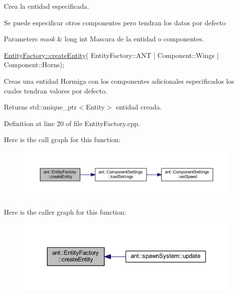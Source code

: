 Crea la entidad especificada. 

Se puede especificar otros componentes pero tendran los datos por defecto


\begin{DoxyParams}{Parameters}
{\em mask} & long int Mascara de la entidad o componentes. 
\begin{DoxyCode}
\hyperlink{classant_1_1_entity_factory_af02c81d4a737ee3d8ddf6f68ad43deb6}{EntityFactory::createEntity}( EntityFactory::ANT | Component::Wings | 
      Component::Horns); 
\end{DoxyCode}
 Creas una entidad Hormiga con los componentes adicionales especificados los cuales tendran valores por defecto. \\
\hline
\end{DoxyParams}
\begin{DoxyReturn}{Returns}
std\+::unique\+\_\+ptr$<$\+Entity$>$ entidad creada. 
\end{DoxyReturn}


Definition at line 20 of file Entity\+Factory.\+cpp.



Here is the call graph for this function\+:
\nopagebreak
\begin{figure}[H]
\begin{center}
\leavevmode
\includegraphics[width=350pt]{db/d10/classant_1_1_entity_factory_af02c81d4a737ee3d8ddf6f68ad43deb6_cgraph}
\end{center}
\end{figure}




Here is the caller graph for this function\+:
\nopagebreak
\begin{figure}[H]
\begin{center}
\leavevmode
\includegraphics[width=344pt]{db/d10/classant_1_1_entity_factory_af02c81d4a737ee3d8ddf6f68ad43deb6_icgraph}
\end{center}
\end{figure}


